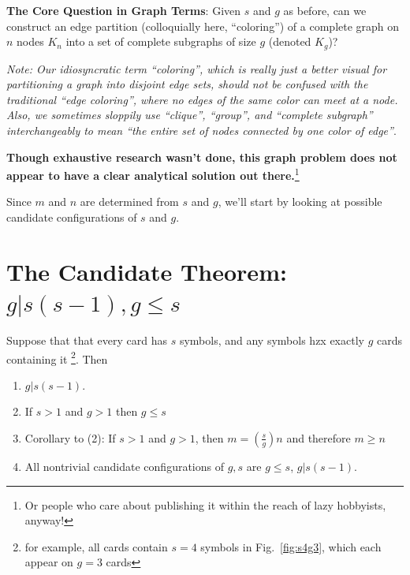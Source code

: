 \documentclass[11pt, oneside]{article} 	%
\begin{document}
\begin{framed}
\textbf{The Core Question in Graph Terms}: Given $s$ and $g$ as before, can we construct an edge partition (colloquially here, ``coloring'') of a complete graph on $n$ nodes $K_n$ into a set of complete subgraphs of size $g$ (denoted $K_g$)?
\end{framed}

\emph{Note: Our idiosyncratic term ``coloring'', which is really just a better visual for partitioning a graph into disjoint edge sets, should not be confused with the traditional ``edge coloring'', where no edges of the same color can meet at a node. Also, we sometimes sloppily use ``clique'', ``group'', and ``complete subgraph'' interchangeably to mean ``the entire set of nodes connected by one color of edge''}.

\textbf{Though exhaustive research wasn't done, this graph problem does not appear to have a clear analytical solution out there.}\footnote{Or people who care about publishing it within the reach of lazy hobbyists, anyway!}

Since $m$ and $n$ are determined from $s$ and $g$, we'll start by looking at possible candidate configurations of $s$ and $g$.

\section{The Candidate Theorem: $g | s(s-1), g \leq s$}

Suppose that that every card has $s$ symbols, and any symbols hzx exactly $g$ cards containing it \footnote{for example, all cards contain $s=4$ symbols in Fig.~\ref{fig:s4g3}, which each appear on $g=3$ cards}. Then 

\begin{framed}
\begin{enumerate}
\item $g | s(s-1)$.
\item If $s >1 $ and $g > 1$ then $g \leq s$ 
\item Corollary to (2): If $s >1 $ and $g > 1$, then $m = (\frac{s}{g})n$ and therefore $m \geq n$
\item All nontrivial candidate configurations of $g, s$ are $g \leq s$, $g | s(s-1)$.
\end{enumerate}
\end{framed}
\end{document}

